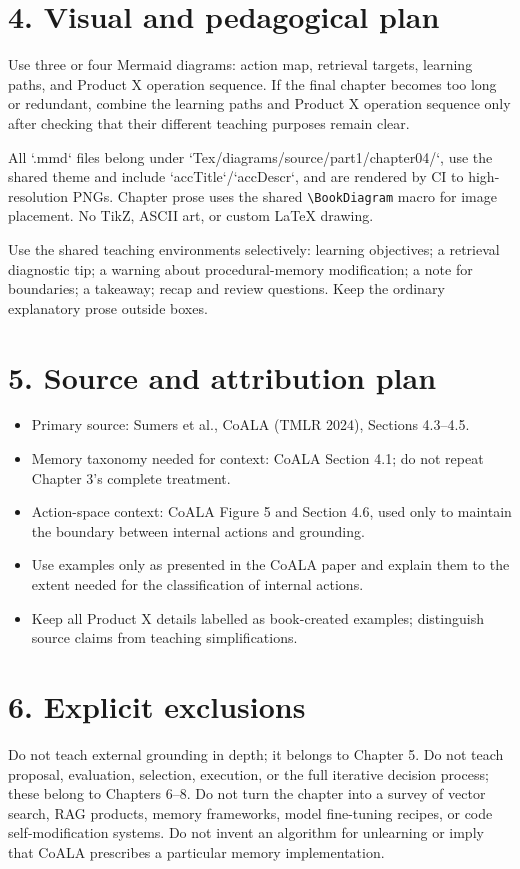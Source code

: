 \section*{4. Visual and pedagogical plan}
Use three or four Mermaid diagrams: action map, retrieval targets, learning paths, and Product X operation sequence. If the final chapter becomes too long or redundant, combine the learning paths and Product X operation sequence only after checking that their different teaching purposes remain clear.

All `.mmd` files belong under `Tex/diagrams/source/part1/chapter04/`, use the shared theme and include `accTitle`/`accDescr`, and are rendered by CI to high-resolution PNGs. Chapter prose uses the shared \verb|\BookDiagram| macro for image placement. No TikZ, ASCII art, or custom LaTeX drawing.

Use the shared teaching environments selectively: learning objectives; a retrieval diagnostic tip; a warning about procedural-memory modification; a note for boundaries; a takeaway; recap and review questions. Keep the ordinary explanatory prose outside boxes.

\section*{5. Source and attribution plan}
\begin{itemize}
  \item Primary source: Sumers et al., CoALA (TMLR 2024), Sections 4.3--4.5.
  \item Memory taxonomy needed for context: CoALA Section 4.1; do not repeat Chapter 3's complete treatment.
  \item Action-space context: CoALA Figure 5 and Section 4.6, used only to maintain the boundary between internal actions and grounding.
  \item Use examples only as presented in the CoALA paper and explain them to the extent needed for the classification of internal actions.
  \item Keep all Product X details labelled as book-created examples; distinguish source claims from teaching simplifications.
\end{itemize}

\section*{6. Explicit exclusions}
Do not teach external grounding in depth; it belongs to Chapter 5. Do not teach proposal, evaluation, selection, execution, or the full iterative decision process; these belong to Chapters 6--8. Do not turn the chapter into a survey of vector search, RAG products, memory frameworks, model fine-tuning recipes, or code self-modification systems. Do not invent an algorithm for unlearning or imply that CoALA prescribes a particular memory implementation.

